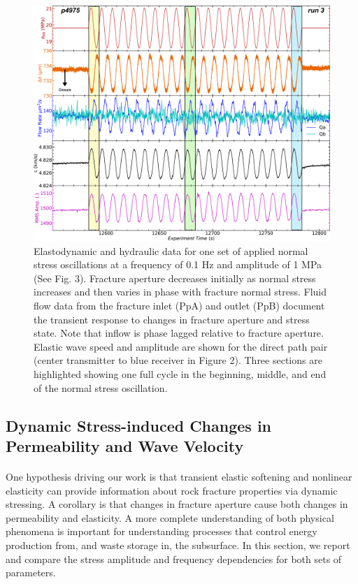 \documentclass[letterpaper,10pt]{article}
\begin{document}
\begin{figure}[ht]
	\centering
	\includegraphics[width=0.9\columnwidth]{NS_p4975_run3}
	\caption[]{Elastodynamic and hydraulic data for one set of applied normal stress oscillations at a frequency of 0.1 Hz and amplitude of 1 MPa (See Fig. 3). Fracture aperture decreases initially as normal stress increases and then varies in phase with fracture normal stress. Fluid flow data from the fracture inlet (PpA) and outlet (PpB) document the transient response to changes in fracture aperture and stress state. Note that inflow is phase lagged relative to fracture aperture. Elastic wave speed and amplitude are shown for the direct path pair (center transmitter to blue receiver in Figure 2). Three sections are highlighted showing one full cycle in the beginning, middle, and end of the normal stress oscillation. }
	\label{fig:NS_p4975_run3b_01Hz}
\end{figure}

\clearpage


\subsection{Dynamic Stress-induced Changes in Permeability and Wave Velocity}
\paragraph{}
One hypothesis driving our work is that transient elastic softening and nonlinear elasticity can provide information about rock fracture properties via dynamic stressing. A corollary is that changes in fracture aperture cause both changes in permeability and elasticity. A more complete understanding of both physical phenomena is important for understanding processes that control energy production from, and waste storage in, the subsurface. In this section, we report and compare the stress amplitude and frequency dependencies for both sets of parameters. 
\end{document}
